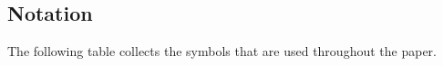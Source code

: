 \subsection{Notation}\label{subsec:notation}

The following table collects the symbols that are used throughout the paper.

